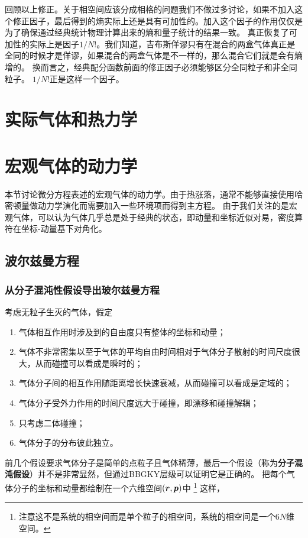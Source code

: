 \documentclass[hyperref, UTF8, a4paper]{ctexart}
\begin{document}
回顾以上修正。关于相空间应该分成相格的问题我们不做过多讨论，如果不加入这个修正因子，最后得到的熵实际上还是具有可加性的。加入这个因子的作用仅仅是为了确保通过经典统计物理计算出来的熵和量子统计的结果一致。
真正恢复了可加性的实际上是因子$1/N!$。我们知道，吉布斯佯谬只有在混合的两盒气体真正是全同的时候才是佯谬，如果混合的两盒气体是不一样的，那么混合它们就是会有熵增的。
换而言之，经典配分函数前面的修正因子必须能够区分全同粒子和非全同粒子。
$1/N!$正是这样一个因子。

\section{实际气体和热力学}



\section{宏观气体的动力学}

本节讨论微分方程表述的宏观气体的动力学。由于热涨落，通常不能够直接使用哈密顿量做动力学演化而需要加入一些环境项而得到主方程。
由于我们关注的是宏观气体，可以认为气体几乎总是处于经典的状态，即动量和坐标近似对易，密度算符在坐标-动量基下对角化。

\subsection{波尔兹曼方程}

\subsubsection{从分子混沌性假设导出玻尔兹曼方程}

考虑无粒子生灭的气体，假定
\begin{enumerate}
    \item 气体相互作用时涉及到的自由度只有整体的坐标和动量；
    \item 气体不非常密集以至于气体的平均自由时间相对于气体分子散射的时间尺度很大，从而碰撞可以看成是瞬时的；
    \item 气体分子间的相互作用随距离增长快速衰减，从而碰撞可以看成是定域的；
    \item 气体分子受外力作用的时间尺度远大于碰撞，即漂移和碰撞解耦；
    \item 只考虑二体碰撞；
    \item 气体分子的分布彼此独立。
\end{enumerate}
前几个假设要求气体分子是简单的点粒子且气体稀薄，最后一个假设（称为\textbf{分子混沌假设}）并不是非常显然，但通过BBGKY层级可以证明它是正确的。
把每个气体分子的坐标和动量都绘制在一个六维空间$(\vb*{r}, \vb*{p})$中
\footnote{注意这不是系统的相空间而是单个粒子的相空间，系统的相空间是一个$6N$维空间。}%
这样，
\end{document}
